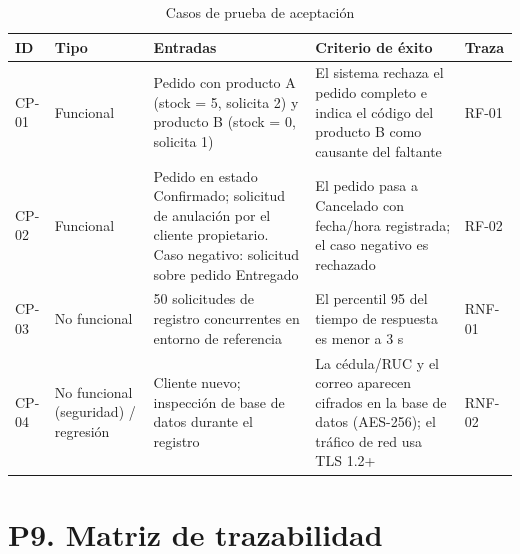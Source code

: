 \documentclass[12pt,a4paper]{article}
\begin{document}
    \begin{table}[H]
    \centering
    \small
    \begin{tabular}{@{}p{1.3cm}p{2cm}p{4.5cm}p{4.5cm}p{1.5cm}@{}}
    \toprule
    \textbf{ID} & \textbf{Tipo} & \textbf{Entradas} & \textbf{Criterio de éxito} & \textbf{Traza} \\
    \midrule
    CP-01 & Funcional & Pedido con producto A (stock = 5, solicita 2) y producto B (stock = 0, solicita 1) & El sistema rechaza el pedido completo e indica el código del producto B como causante del faltante & RF-01 \\
    \addlinespace
    CP-02 & Funcional & Pedido en estado Confirmado; solicitud de anulación por el cliente propietario. Caso negativo: solicitud sobre pedido Entregado & El pedido pasa a Cancelado con fecha/hora registrada; el caso negativo es rechazado & RF-02 \\
    \addlinespace
    CP-03 & No funcional & 50 solicitudes de registro concurrentes en entorno de referencia & El percentil 95 del tiempo de respuesta es menor a 3 s & RNF-01 \\
    \addlinespace
    CP-04 & No funcional (seguridad) / regresión & Cliente nuevo; inspección de base de datos durante el registro & La cédula/RUC y el correo aparecen cifrados en la base de datos (AES-256); el tráfico de red usa TLS 1.2+ & RNF-02 \\
    \bottomrule
    \end{tabular}
    \caption{Casos de prueba de aceptación}
    \end{table}
    
    \section{P9. Matriz de trazabilidad}
    
\end{document}
